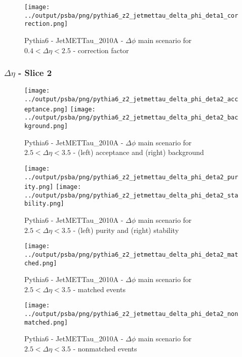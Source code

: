\documentclass[11pt]{book}
\begin{document}
\begin{figure}[ht]
\centering
\texttt{[image: ../output/psba/png/pythia6\_z2\_jetmettau\_delta\_phi\_deta1\_correction.png]}
\caption{Pythia6 - JetMETTau\_2010A - $\Delta\phi$ main scenario for $0.4 < \Delta\eta < 2.5$ - correction factor}
\label{fig:p6_jetmettau_delta_phi_deta1_correction}
\end{figure}

\clearpage
\subsubsection{$\Delta\eta$ - Slice 2}

\begin{figure}[ht]
\centering
\texttt{[image: ../output/psba/png/pythia6\_z2\_jetmettau\_delta\_phi\_deta2\_acceptance.png]}
\texttt{[image: ../output/psba/png/pythia6\_z2\_jetmettau\_delta\_phi\_deta2\_background.png]}
\caption{Pythia6 - JetMETTau\_2010A - $\Delta\phi$ main scenario for $2.5 < \Delta\eta < 3.5$ - (left) acceptance and (right) background}
\label{fig:p6_jetmettau_delta_phi_deta2_ab}
\end{figure}

\begin{figure}[ht]
\centering
\texttt{[image: ../output/psba/png/pythia6\_z2\_jetmettau\_delta\_phi\_deta2\_purity.png]}
\texttt{[image: ../output/psba/png/pythia6\_z2\_jetmettau\_delta\_phi\_deta2\_stability.png]}
\caption{Pythia6 - JetMETTau\_2010A - $\Delta\phi$ main scenario for $2.5 < \Delta\eta < 3.5$ - (left) purity and (right) stability}
\label{fig:p6_jetmettau_delta_phi_deta2_ps}
\end{figure}

\begin{figure}[ht]
\centering
\texttt{[image: ../output/psba/png/pythia6\_z2\_jetmettau\_delta\_phi\_deta2\_matched.png]}
\caption{Pythia6 - JetMETTau\_2010A - $\Delta\phi$ main scenario for $2.5 < \Delta\eta < 3.5$ - matched events}
\label{fig:p6_jetmettau_delta_phi_deta2_matched}
\end{figure}

\begin{figure}[ht]
\centering
\texttt{[image: ../output/psba/png/pythia6\_z2\_jetmettau\_delta\_phi\_deta2\_nonmatched.png]}
\caption{Pythia6 - JetMETTau\_2010A - $\Delta\phi$ main scenario for $2.5 < \Delta\eta < 3.5$ - nonmatched events}
\label{fig:p6_jetmettau_delta_phi_deta2_nonmatched}
\end{figure}
\end{document}
